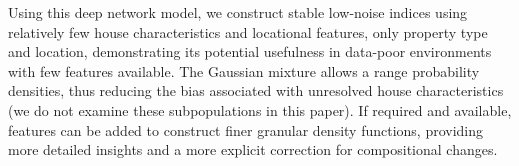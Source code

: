 Using this deep network model, we construct stable low-noise indices using relatively few house characteristics and locational features, only property type and location, demonstrating its potential usefulness in data-poor environments with few features available. The Gaussian mixture allows a range probability densities, thus reducing the bias associated with unresolved house characteristics (we do not examine these subpopulations in this paper). If required and available, features can be added to construct finer granular density functions, providing more detailed insights and a more explicit correction for compositional changes.


\newpage



\clearpage
\begingroup

\setlength\bibsep{0.5pt}

\endgroup

\appendix
\clearpage



